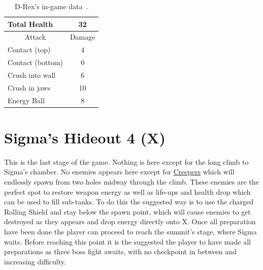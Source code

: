 \begin{table}
	\centering
	\begin{tabular}[htp]{l c}
		\toprule
		Total Health  & 32\\
		\midrule
		\multicolumn{1}{c}{Attack} & \multicolumn{1}{c}{Damage}\\
		Contact (top) & 4\\
		Contact (bottom) & 0\\
		Crush into wall & 6\\
		Crush in jaws & 10\\
		Energy Ball & 8\\
		\bottomrule
	\end{tabular}
	\caption{D-Rex's in-game data~\cite{wiki:D-REX}.}
\end{table}
\section{Sigma's Hideout 4 (X)}
This is the last stage of the game. Nothing  is here except for the long climb to Sigma's chamber. No enemies appears here except for \hyperlink{enem:Creeper}{Creepers} which will endlessly spawn from two holes midway through the climb. These enemies are the perfect spot to restore weapon energy as well as life-ups and health drop which can be used to fill sub-tanks. To do this the suggested way is to use the charged Rolling Shield and stay below the spawn point, which will cause enemies to get destroyed as they appears and drop energy directly onto X. Once all preparation have been done the player can proceed to reach the summit's stage, where Sigma waits. Before reaching this point it is the suggested the player to have made all preparations as three boss fight awaits, with no checkpoint in between and increasing difficulty.

